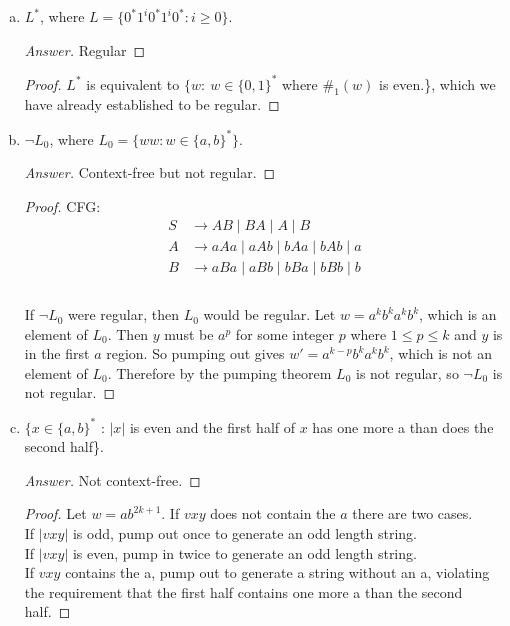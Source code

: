 \documentclass[10pt]{article}
\newcommand{\card}[1]{\left| #1 \right|}
\begin{document}
\begin{enumerate}[1)]
\begin{enumerate}[a)]
\item
$L^*$, where $L = \{0^*1^i0^*1^i0^* : i \geq 0\}$.
\begin{proof}[Answer]
Regular
\end{proof}
\begin{proof}[Proof]
$L^*$ is equivalent to $\{w:\ w \in \{0, 1\}^*$ where $\#_1(w)$ is even.\}, which we have already established to be regular.
\end{proof}

\item
$\lnot L_0$, where $L_0 = \{ww : w \in \{a, b\}^*\}$.
\begin{proof}[Answer]
Context-free but not regular.
\end{proof}
\begin{proof}[Proof]
CFG:
\begin{align*}
S &\rightarrow AB \mid BA \mid A \mid B\\
A &\rightarrow aAa \mid aAb \mid bAa \mid bAb \mid a\\
B &\rightarrow aBa \mid aBb \mid bBa \mid bBb \mid b\\
\end{align*}\\
If $\lnot L_0$ were regular, then $L_0$ would be regular.  Let $w = a^kb^ka^kb^k$, which is an element of $L_0$.  Then $y$ must be $a^p$ for some integer $p$ where $1 \leq p \leq k$ and $y$ is in the first $a$ region.  So pumping out gives $w' = a^{k-p}b^ka^kb^k$, which is not an element of $L_0$.  Therefore by the pumping theorem $L_0$ is not regular, so $\lnot L_0$ is not regular.
\end{proof}

\item
$\{x \in \{a, b\}^*$ : $\card{x}$ is even and the first half of $x$ has one more a than does the second half\}.
\begin{proof}[Answer]
Not context-free.
\end{proof}
\begin{proof}[Proof]
Let $w = ab^{2k+1}$.  If $vxy$ does not contain the $a$ there are two cases.\\
If $\card{vxy}$ is odd, pump out once to generate an odd length string.\\
If $\card{vxy}$ is even, pump in twice to generate an odd length string.\\
If $vxy$ contains the a, pump out to generate a string without an a, violating the requirement that the first half contains one more a than the second half.
\end{proof}
\end{enumerate}


\end{enumerate}
\end{document}
